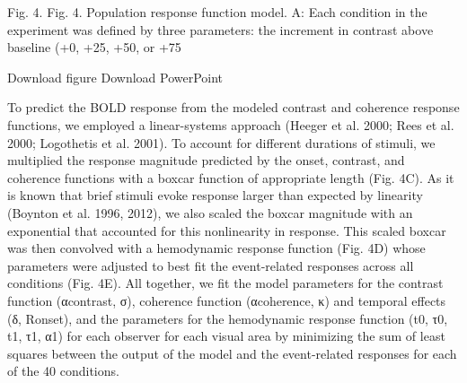 \documentclass{report}
\begin{document}
Fig. 4.
Fig. 4.
Population response function model. A: Each condition in the experiment was defined by three parameters: the increment in contrast above baseline (+0, +25, +50, or +75%

Download figure Download PowerPoint

To predict the BOLD response from the modeled contrast and coherence response functions, we employed a linear-systems approach (Heeger et al. 2000; Rees et al. 2000; Logothetis et al. 2001). To account for different durations of stimuli, we multiplied the response magnitude predicted by the onset, contrast, and coherence functions with a boxcar function of appropriate length (Fig. 4C). As it is known that brief stimuli evoke response larger than expected by linearity (Boynton et al. 1996, 2012), we also scaled the boxcar magnitude with an exponential that accounted for this nonlinearity in response. This scaled boxcar was then convolved with a hemodynamic response function (Fig. 4D) whose parameters were adjusted to best fit the event-related responses across all conditions (Fig. 4E). All together, we fit the model parameters for the contrast function (αcontrast, σ), coherence function (αcoherence, κ) and temporal effects (δ, Ronset), and the parameters for the hemodynamic response function (t0, τ0, t1, τ1, α1) for each observer for each visual area by minimizing the sum of least squares between the output of the model and the event-related responses for each of the 40 conditions.
\end{document}
